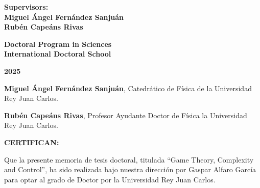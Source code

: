 \documentclass[a4paper,12pt,nofootinbib]{newsiambook}
\newcommand{\clearemptydoublepage}{\newpage{\pagestyle{empty}\cleardoublepage}}
\begin{document}
\begin{center}
\vspace*{1cm}

\begin{center}
	{ \bf Supervisors: \\
		\vspace*{0.25cm}
		Miguel \'Angel Fern\'andez Sanju\'an\\
		\vspace*{0.25cm} 
		Rub\'en Cape\'ans Rivas}
\end{center}

\vspace*{1cm}

\begin{center}
	{\bf Doctoral Program in Sciences\\
		International Doctoral School}
\end{center} 

\vspace*{0.5cm}

\begin{center}
	{\bf \Large 2025}
\end{center}                         %

\end{center}

\clearemptydoublepage \frontmatter

\thispagestyle{empty}






\clearemptydoublepage


\noindent
\textbf{Miguel Ángel Fernández Sanjuán}, Catedrático de Física de la Universidad Rey Juan Carlos. 

\vspace*{0.5cm}

\noindent
\textbf{Rubén Capeáns Rivas}, Profesor Ayudante Doctor de Física la Universidad Rey Juan Carlos.


\vspace*{1.5cm}

\textbf{CERTIFICAN:}

\vspace*{1.5cm}

Que la presente memoria de tesis doctoral, titulada “Game Theory, Complexity and Control”, ha sido realizada bajo nuestra dirección por Gaspar Alfaro García para optar al grado de Doctor por la Universidad Rey Juan Carlos. 
\end{document}
